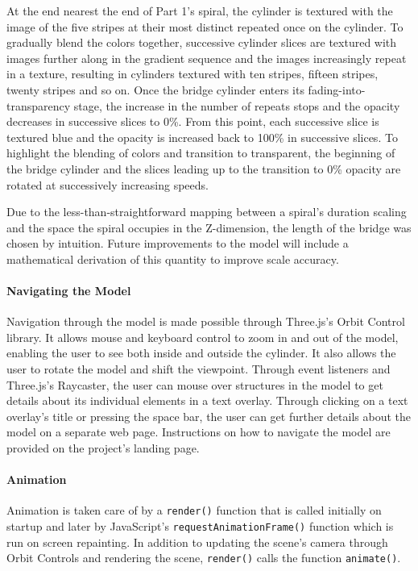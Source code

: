 \documentclass[sigconf]{nimeart}
\begin{document}
At the end nearest the end of Part 1's spiral, the cylinder is textured with the image of the five stripes at their most distinct repeated once on the cylinder. To gradually blend the colors together, successive cylinder slices are textured with images further along in the gradient sequence and the images increasingly repeat in a texture, resulting in cylinders textured with ten stripes, fifteen stripes, twenty stripes and so on. Once the bridge cylinder enters its fading-into-transparency stage, the increase in the number of repeats stops and the opacity decreases in successive slices to 0\%. From this point, each successive slice is textured blue and the opacity is increased back to 100\% in successive slices. To highlight the blending of colors and transition to transparent, the beginning of the bridge cylinder and the slices leading up to the transition to 0\% opacity are rotated at successively increasing speeds.

Due to the less-than-straightforward mapping between a spiral's duration scaling and the space the spiral occupies in the Z-dimension, the length of the bridge was chosen by intuition. Future improvements to the model will include a mathematical derivation of this quantity to improve scale accuracy.

\paragraph{Navigating the Model}\label{navigating-the-model}

Navigation through the model is made possible through Three.js's Orbit Control library. It allows mouse and keyboard control to zoom in and out of the model, enabling the user to see both inside and outside the cylinder. It also allows the user to rotate the model and shift the viewpoint. Through event listeners and Three.js's Raycaster, the user can mouse over structures in the model to get details about its individual elements in a text overlay. Through clicking on a text overlay's title or pressing the space bar, the user can get further details about the model on a separate web page. Instructions on how to navigate the model are provided on the project's landing page.

\paragraph{Animation}\label{animation}

Animation is taken care of by a \texttt{render()} function that is called initially on startup and later by JavaScript's \texttt{requestAnimationFrame()} function which is run on screen repainting. In addition to updating the scene's camera through Orbit Controls and rendering the scene, \texttt{render()} calls the function \texttt{animate()}.
\end{document}

